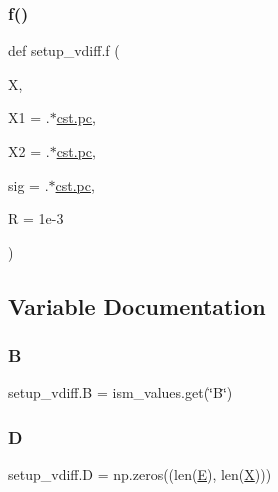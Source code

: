 \mbox{\label{namespacesetup__vdiff_a5329b0899ca891d3f000cc80bdf7b214}} 
\subsubsection{\texorpdfstring{f()}{f()}}
{\footnotesize\ttfamily def setup\+\_\+vdiff.\+f (\begin{DoxyParamCaption}\item[{}]{X,  }\item[{}]{X1 = {.$\ast$\hyperlink{constants_8h_a2884cd030c4c825754349a525a1d06ce}{cst.\+pc}},  }\item[{}]{X2 = {.$\ast$\hyperlink{constants_8h_a2884cd030c4c825754349a525a1d06ce}{cst.\+pc}},  }\item[{}]{sig = {.$\ast$\hyperlink{constants_8h_a2884cd030c4c825754349a525a1d06ce}{cst.\+pc}},  }\item[{}]{R = {\ttfamily 1e-\/3} }\end{DoxyParamCaption})}



\subsection{Variable Documentation}
\mbox{\label{namespacesetup__vdiff_a4d3774a744ba299dec1abfdd1604dd6b}} 
\subsubsection{\texorpdfstring{B}{B}}
{\footnotesize\ttfamily setup\+\_\+vdiff.\+B = ism\+\_\+values.\+get(\char`\"{}B\char`\"{})}

\mbox{\label{namespacesetup__vdiff_a31ceb35447c52ca1899ce1833ccdccaa}} 
\subsubsection{\texorpdfstring{D}{D}}
{\footnotesize\ttfamily setup\+\_\+vdiff.\+D = np.\+zeros((len(\hyperlink{namespacesetup__vdiff_a7780682c76ff3896106f4045b64e582a}{E}), len(\hyperlink{namespacesetup__vdiff_a2d0381db5d912bb072d7cfa7c997de97}{X})))}

